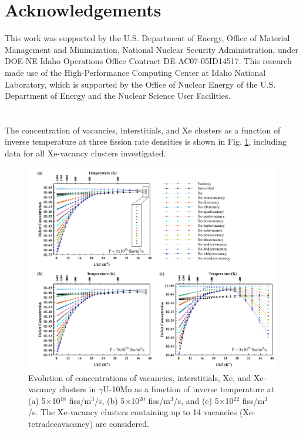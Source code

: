 \documentclass[preprint,12pt]{elsarticle}
\begin{document}
\section{Acknowledgements}
This work was supported by the U.S. Department of Energy, Office of Material Management and Minimization, National Nuclear Security Administration, under DOE-NE Idaho Operations Office Contract DE-AC07-05ID14517. This research made use of the High-Performance Computing Center at Idaho National Laboratory, which is supported by the Office of Nuclear Energy of the U.S. Department of Energy and the Nuclear Science User Facilities. 

\clearpage
\appendix
\section{}

\setcounter{figure}{0}

The concentration of vacancies, interstitials, and Xe clusters as a function of inverse temperature at three fission rate densities is shown in Fig. \ref{fig:FEBE}, including data for all Xe-vacancy clusters investigated.

\begin{figure}[hbt!]
\centering
\includegraphics[width=1\textwidth]{A1.png}
\caption{Evolution of concentrations of vacancies, interstitials, Xe, and Xe-vacancy clusters in $\gamma$U-10Mo as a function of inverse temperature at (a) 5$\times$10$^{18}$ fiss/m$^{3}$/s, (b) 5$\times$10$^{20}$ fiss/m$^{3}$/s, and (c) 5$\times$10$^{22}$ fiss/m$^{3}$/s. The Xe-vacancy clusters containing up to 14 vacancies (Xe-tetradecavacancy) are considered.}
\label{fig:FEBE}
\end{figure}
\clearpage
 

\end{document}
